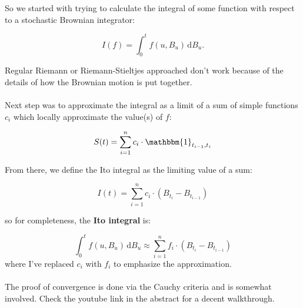 \documentclass[12pt]{article}
\begin{document}
So we started with trying to calculate the integral of some function with respect to a stochastic Brownian integrator:

\begin{equation}
	I(f)=\int_{0}^{t}f(u,B_u)\,\mathrm{d}B_u.
\end{equation}

\noindent Regular Riemann or Riemann-Stieltjes approached don't work because of the details of how the Brownian motion is put together.\\
\\
Next step was to approximate the integral as a limit of a sum of simple functions $c_i$ which locally approximate the value(s) of $f$:

\begin{equation}
	S(t)=\sum_{i=1}^{n}c_i\cdot\mathbbm{1}_{t_{i-1}, t_i}
\end{equation}

\noindent From there, we define the Ito integral as the limiting value of a sum:

\begin{equation}
	I(t)=\sum_{i=1}^{n}c_i\cdot\left(B_{t_i}-B_{t_{i-1}}\right)
\end{equation}


\noindent so for completeness, the \textbf{Ito integral} is:

\begin{equation}
	\int_{0}^{t}f(u,B_u)\,\mathrm{d}B_u\approx\sum_{i=1}^{n}f_i\cdot\left(B_{t_i}-B_{t_{i-1}}\right)
\end{equation}
\noindent where I've replaced $c_i$ with $f_i$ to emphasize the approximation.\\
\\
The proof of convergence is done via the Cauchy criteria and is somewhat involved. Check the youtube link in the abstract for a decent walkthrough.
\end{document}
